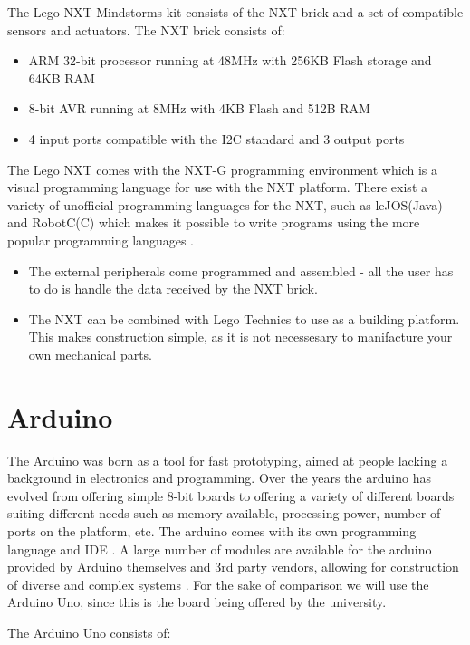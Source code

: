 The Lego NXT Mindstorms kit consists of the NXT brick and a set of
compatible sensors and actuators. The NXT brick \citep[P.70]{NXTStats} consists
of:

\begin{itemize}
  \item ARM 32-bit processor running at 48MHz with 256KB Flash storage and 64KB RAM
  \item 8-bit AVR running at 8MHz with 4KB Flash and 512B RAM
  \item 4 input ports compatible with the I2C standard and 3 output ports
\end{itemize}

The Lego NXT comes with the NXT-G programming environment which is a visual
programming language for use with the NXT platform. There exist a variety of
unofficial programming languages for the NXT, such as leJOS(Java) and
RobotC(C) which makes it possible to write programs using the more popular programming
languages \citep{NXTProgrammingLanguage}.

\begin{itemize}
  \item The external peripherals come programmed and assembled - all the user
  has to do is handle the data received by the NXT brick.
  \item The NXT can be combined with Lego Technics to use as a building
  platform. This makes construction simple, as it is not necessesary to
  manifacture your own mechanical parts.
\end{itemize}

\section{Arduino}
The Arduino was born as a tool for fast prototyping, aimed at people lacking a
background in electronics and programming. Over the years the arduino has
evolved from offering simple 8-bit boards to offering a variety of different
boards suiting different needs such as memory available, processing power,
number of ports on the platform, etc. The arduino comes with its
own programming language and IDE \citep{ArduinoIntro}. A large number of modules are available for
the arduino provided by Arduino themselves and 3rd party vendors, allowing for
construction of diverse and complex systems \citep{ArduinoComponents}. For the
sake of comparison we will use the Arduino Uno, since this is the board being
offered by the university.\nl

The Arduino Uno consists of:

